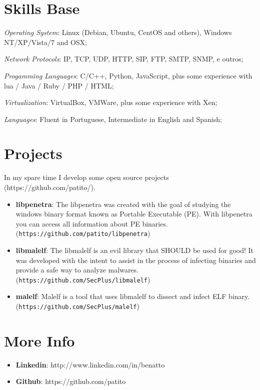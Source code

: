 \documentclass[margin]{res}
\begin{document}
\begin{resume}
\section{Skills Base}  \textit{Operating System}:  Linux (Debian, Ubuntu, CentOS and others), Windows NT/XP/Vista/7 and OSX;

			\textit{Network Protocols}: IP, TCP, UDP, HTTP, SIP, FTP, SMTP, SNMP, e outros;
  
			\textit{Progamming Languages}: C/C++, Python, JavaScript, plus some experience with lua / Java / Ruby / PHP / HTML;
  
			\textit{Virtualization}: VirtualBox, VMWare, plus some experience with Xen;

			\textit{Languages}: Fluent in Portuguese, Intermediate in English and Spanish;
 
\section{Projects}
		In my spare time I develop some open source projects (https://github.com/patito/).
		
		\begin{itemize}
		\vspace{2mm}
		\item \textbf{libpenetra}: The libpenetra was created with the goal of studying the windows binary format known as Portable Executable (PE). With libpenetra you can access all information about PE binaries. (\texttt{https://github.com/patito/libpenetra})\vspace{1mm}	
		\item \textbf{libmalelf}: The libmalelf is an evil library that SHOULD be used for good! It was developed with the intent to assist in the process of infecting binaries and provide a safe way to analyze malwares. (\texttt{https://github.com/SecPlus/libmalelf})\vspace{1mm}
		\item \textbf{malelf}: Malelf is a tool that uses libmalelf to dissect and infect ELF binary. (\texttt{https://github.com/SecPlus/malelf})
		\end{itemize}
 
\section{More Info}
    \begin{itemize}
     \item \textbf{Linkedin}: http://www.linkedin.com/in/benatto
     \item \textbf{Github}: https://github.com/patito
    \end{itemize}


\end{resume} 
\end{document}
